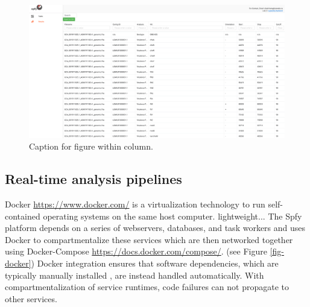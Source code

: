 \documentclass[a4,center,fleqn]{NAR}
\begin{document}
\begin{figure}[t]
\begin{center}
\includegraphics{images/tables.png}
\end{center}
\caption{Caption for figure within column.}
\label{fig-tables}
\end{figure}

\subsection{Real-time analysis pipelines}



Docker \url{https://www.docker.com/} is a virtualization technology to run self-contained operating systems on the same host computer.
lightweight...
The Spfy platform depends on a series of webservers, databases, and task workers and uses Docker to compartmentalize these services which are then networked together using Docker-Compose \url{https://docs.docker.com/compose/}.
(see Figure \ref{fig-docker})
Docker integration ensures that software dependencies, which are typically manually installed \cite{doi:10.1093/bioinformatics/btu153,laing2010pan,inouye2014srst2,naccache2014cloud}, are instead handled automatically. With compartmentalization of service runtimes, code failures can not propagate to other services.
\end{document}
